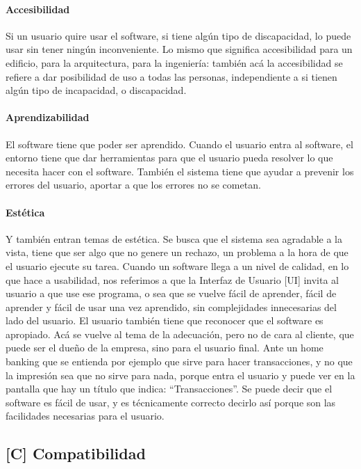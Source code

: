 \hypertarget{accesibilidad}{%
\paragraph{Accesibilidad}\label{accesibilidad}}
Si un usuario quire usar el software, si tiene
  algún tipo de discapacidad, lo puede usar sin tener ningún
  inconveniente. Lo mismo que significa accesibilidad para un edificio,
  para la arquitectura, para la ingeniería: también acá la accesibilidad
  se refiere a dar posibilidad de uso a todas las personas,
  independiente a si tienen algún tipo de incapacidad, o discapacidad.
\hypertarget{aprendizabilidad}{%
\paragraph{Aprendizabilidad}\label{aprendizabilidad}}
 El software tiene que poder ser aprendido.
  Cuando el usuario entra al software, el entorno tiene que dar
  herramientas para que el usuario pueda resolver lo que necesita hacer
  con el software.
  También el sistema tiene que ayudar a prevenir los
  errores del usuario, aportar a que los errores no se cometan.
\hypertarget{estetica}{%
\paragraph{Estética}\label{estetica}}
  Y también entran temas de estética. Se busca que el sistema sea
  agradable a la vista, tiene que ser algo que no genere un rechazo, un
  problema a la hora de que el usuario ejecute su tarea. Cuando un
  software llega a un nivel de calidad, en lo que hace a usabilidad, nos
  referimos a que la Interfaz de Usuario {[}UI{]} invita al usuario a
  que use ese programa, o sea que se vuelve fácil de aprender, fácil de
  aprender y fácil de usar una vez aprendido, sin complejidades
  innecesarias del lado del usuario. El usuario también tiene que
  reconocer que el software es apropiado. Acá se vuelve al tema de la
  adecuación, pero no de cara al cliente, que puede ser el dueño de la
  empresa, sino para el usuario final. Ante un home banking que se
  entienda por ejemplo que sirve para hacer transacciones, y no que la
  impresión sea que no sirve para nada, porque entra el usuario y puede
  ver en la pantalla que hay un título que indica: ``Transacciones''. Se
  puede decir que el software es fácil de usar, y es técnicamente
  correcto decirlo así porque son las facilidades necesarias para el
  usuario.

\hypertarget{compatibilidad-c}{%
\subsection{%
{[}C{]}
Compatibilidad
}\label{compatibilidad-c}}


